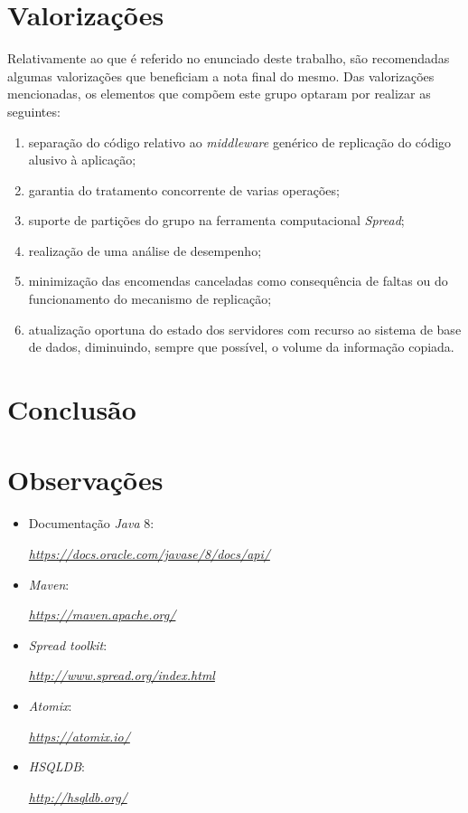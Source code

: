 \documentclass[a4paper]{report}
\begin{document}
\chapter{Valorizações} \label{ch:ProblemDescription}
\large{
	Relativamente ao que é referido no enunciado deste trabalho, são recomendadas algumas valorizações que beneficiam a nota final do mesmo.
	Das valorizações mencionadas, os elementos que compõem este grupo optaram por realizar as seguintes:
	\begin{enumerate}
		\item separação do código relativo ao \textit{middleware} genérico de replicação do código alusivo à aplicação;
		\item garantia do tratamento concorrente de varias operações;
		\item suporte de partições do grupo na ferramenta computacional \textit{Spread};
		\item realização de uma análise de desempenho;
		\item minimização das encomendas canceladas como consequência de faltas ou do funcionamento do mecanismo de replicação;
		\item atualização oportuna do estado dos servidores com recurso ao sistema de base de dados, diminuindo, sempre que possível, o volume da informação copiada.
	\end{enumerate}
}

\chapter{Conclusão} \label{ch:Conclusion}
\large{
	
}

\appendix
\chapter{Observações} \label{ch:Observations}
\begin{itemize}
    \item Documentação \textit{Java} 8:
    \par \textit{\url{https://docs.oracle.com/javase/8/docs/api/}}
	\item \textit{Maven}:
	\par \textit{\url{https://maven.apache.org/}}
	\item \textit{Spread toolkit}:
	\par \textit{\url{http://www.spread.org/index.html}}
	\item \textit{Atomix}:
	\par \textit{\url{https://atomix.io/}}
	\item \textit{HSQLDB}:
	\par \textit{\url{http://hsqldb.org/}}
\end{itemize}
\end{document}
